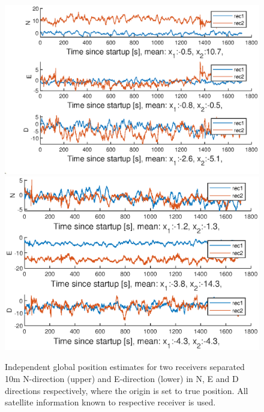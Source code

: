 \begin{figure}[H]
\includegraphics[width=1\textwidth]{Results/DistNED30MinNAllSat}
\includegraphics[width=1\textwidth]{Results/DistNED30MinEAllSat}
\caption{\label{fig:globalPosAllSV} Independent global position estimates for two receivers separated 10m N-direction (upper) and E-direction (lower) in N, E and D directions respectively, where the origin is set to true position. All satellite information known to respective receiver is used.}
\end{figure}
